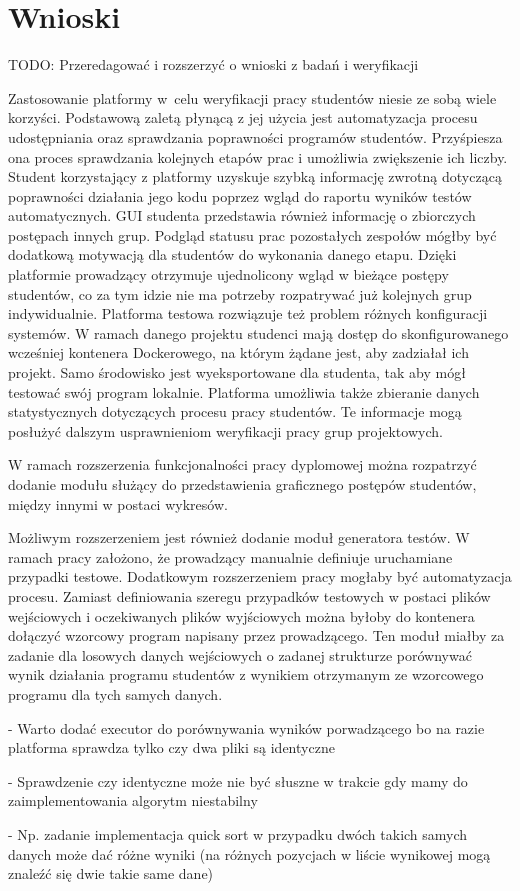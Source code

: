 \chapter{Wnioski}
\label{chapter:conclusion}

TODO: Przeredagować i rozszerzyć o wnioski z badań i weryfikacji

Zastosowanie platformy w~celu weryfikacji pracy studentów niesie ze sobą wiele korzyści.
Podstawową zaletą płynącą z jej użycia jest automatyzacja procesu udostępniania oraz sprawdzania poprawności programów studentów.
Przyśpiesza ona proces sprawdzania kolejnych etapów prac i umożliwia zwiększenie ich liczby.
Student korzystający z platformy uzyskuje szybką informację zwrotną dotyczącą poprawności działania jego kodu poprzez wgląd do raportu wyników testów automatycznych.
GUI studenta przedstawia również informację o zbiorczych postępach innych grup.
Podgląd statusu prac pozostałych zespołów mógłby być dodatkową motywacją dla studentów do wykonania danego etapu.
Dzięki platformie prowadzący otrzymuje ujednolicony wgląd w bieżące postępy studentów, co za tym idzie nie ma potrzeby rozpatrywać już kolejnych grup indywidualnie.
Platforma testowa rozwiązuje też problem różnych konfiguracji systemów.
W ramach danego projektu studenci mają dostęp do skonfigurowanego wcześniej kontenera Dockerowego, na którym żądane jest, aby zadziałał ich projekt.
Samo środowisko jest wyeksportowane dla studenta, tak aby mógł testować swój program lokalnie.
Platforma umożliwia także zbieranie danych statystycznych dotyczących procesu pracy studentów.
Te informacje mogą posłużyć dalszym usprawnieniom weryfikacji pracy grup projektowych.

W ramach rozszerzenia funkcjonalności pracy dyplomowej można rozpatrzyć dodanie modułu służący do przedstawienia graficznego postępów studentów, między innymi w postaci wykresów.

Możliwym rozszerzeniem jest również dodanie moduł generatora testów.
W ramach pracy założono, że prowadzący manualnie definiuje uruchamiane przypadki testowe.
Dodatkowym rozszerzeniem pracy mogłaby być automatyzacja procesu.
Zamiast definiowania szeregu przypadków testowych w postaci plików wejściowych i oczekiwanych plików wyjściowych można byłoby do kontenera dołączyć wzorcowy program napisany przez prowadzącego.
Ten moduł miałby za zadanie dla losowych danych wejściowych o zadanej strukturze porównywać wynik działania programu studentów z wynikiem otrzymanym ze wzorcowego programu dla tych samych danych.


- Warto dodać executor do porównywania wyników porwadzącego bo na razie platforma sprawdza tylko czy dwa pliki są identyczne

- Sprawdzenie czy identyczne może nie być słuszne w trakcie gdy mamy do zaimplementowania algorytm niestabilny

- Np. zadanie implementacja quick sort w przypadku dwóch takich samych danych może dać różne wyniki (na różnych pozycjach w liście wynikowej mogą znaleźć się dwie takie same dane)